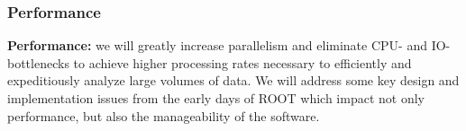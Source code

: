\begin{frame}
\frametitle{Performance}

\textbf{Performance:} we will greatly increase parallelism and eliminate CPU- and IO-bottlenecks to achieve higher processing rates necessary to efficiently
and expeditiously analyze large volumes of data.
We will address some key design and implementation
issues from the early days of ROOT which impact
not only performance, but also the manageability of the software.



\end{frame}


